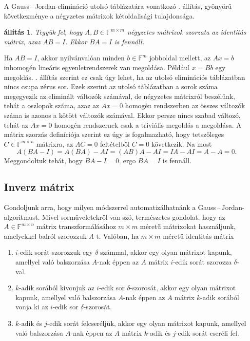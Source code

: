 \documentclass[9pt, a4paper, showtrims]{memoir}
\makeatletter
\let\Aref\relax
\renewenvironment{proof}[1][\proofname]
    {\par\pushQED{\qed}%
    \normalfont \topsep6\p@\@plus6\p@\relax
    \trivlist
    \item[\hskip\labelsep
        \itshape
    #1\@addpunct{:}]\ignorespaces}
    {\popQED\endtrivlist\@endpefalse}
\theoremstyle{plain}
\newtheorem{proposition}{állítás}[chapter]
\theoremstyle{remark}
\theoremstyle{definition}
\makeatother
\begin{document}
A Gauss\,--\,Jordan-elimináció utolsó táblázatára vonatkozó . állítás, gyönyörű
következménye a négyzetes mátrixok kétoldalisági tulajdonsága.
\begin{proposition}
    Tegyük fel, hogy $A,B\in\mathbb{F}^{m\times m}$ négyzetes mátrixok szorzata az identitás mátrix,
    azaz $AB=I$.
    Ekkor $BA=I$ is fennáll.
    \label{pr:ketoldal}
\end{proposition}
\begin{proof}
    Ha $AB=I$, akkor nyilvánvalóan minden $b\in\mathbb{F}^m$ jobboldal mellett,
    az $Ax=b$ inhomogén lineáris egyenletrendszerek van megoldása. 
    Például $x=Bb$ egy megoldás.
    \Aref{pr:nincsmo}. állítás szerint ez csak úgy lehet, ha az utolsó eliminációs táblázatban nincs csupa zérus sor.
    Ezek szerint az utolsó táblázatban a sorok száma megegyezik az eliminált változók számával,
    de négyzetes mátrixról beszélünk, tehát a oszlopok száma, azaz az $Ax=0$ homogén rendszerben
    az összes változók száma is azonos a kötött változók számával.
    Ekkor persze nincs szabad változó, tehát az $Ax=0$ homogén rendszernek csak a triviális megoldás a megoldása.
    A mátrix szorzás definíciója szerint ez úgy is fogalmazható, hogy
    tetszőleges $C\in\mathbb{F}^{m\times n}$ mátrixra, az $AC=0$ feltételből $C=0$ következik.
    Na most
    \[
        A\left(BA-I  \right)=A\left( BA \right)-AI=\left( AB \right)A-AI=IA-AI=A-A=0.
    \]
    Meggondoltuk tehát, hogy $BA-I=0$, ergo $BA=I$ is fennáll.
\end{proof}
\subsection{Inverz mátrix}
Gondoljunk arra, hogy milyen módszerrel automatizálhatnánk a Gauss\,--\,Jordan-algoritmust.
Mivel sorműveletekről van szó, természetes gondolat, hogy az $A\in\mathbb{F}^{m\times n}$
mátrix transzformálásához $m\times m$ méretű mátrixokat használjunk,
amelyekkel balról szorozzuk $A$-t.
Valóban, ha $m\times m$ méretű identitás mátrix
\begin{enumerate}
	\item
	      $i$-edik sorát szorozzuk egy $\delta$ számmal,
	      akkor egy olyan mátrixot kapunk,
	      amellyel való balszorzása $A$-nak éppen az $A$ mátrix
	      $i$-edik sorát szorozza $\delta$-val.
	\item
	      $k$-adik sorából kivonjuk az $i$-edik sor $\delta$-szorosát,
	      akkor egy olyan mátrixot kapunk,
	      amellyel való balszorzása $A$-nak éppen az $A$ mátrix
	      $k$-adik sorából vonja ki az $i$-edik sor $\delta$-szorosát.
	\item
	      $k$-adik és $j$-edik sorát felcseréljük,
	      akkor egy olyan mátrixot kapunk,
	      amellyel való balszorzása $A$-nak éppen az $A$ mátrix
	      $k$-adik és $j$-edik sorát cseréli fel.
\end{enumerate}
\end{document}
